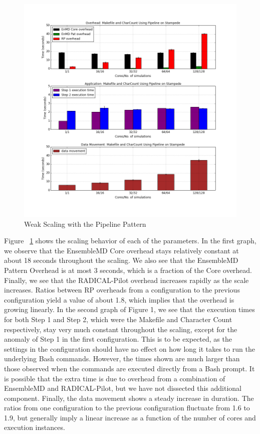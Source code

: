 \documentclass[]{article}
\begin{document}
		
		\begin{figure}[H]
			\centering
			\includegraphics[scale=.30]{img/pipeline_weak_scaling.png}
			\caption{Weak Scaling with the Pipeline Pattern}
			\label{fig:pipeline_weak_scaling}
		\end{figure}

		Figure ~\ref{fig:pipeline_weak_scaling} shows the scaling behavior of each of the parameters. In the first graph, we observe that the EnsembleMD Core overhead stays relatively constant at about 18 seconds throughout the scaling. We also see that the EnsembleMD Pattern Overhead is at most 3 seconds, which is a fraction of the Core overhead. Finally, we see that the RADICAL-Pilot overhead increases rapidly as the scale increases. Ratios between RP overheads from a configuration to the previous configuration yield a value of about 1.8, which implies that the overhead is growing linearly.
		In the second graph of Figure 1, we see that the execution times for both Step 1 and Step 2, which were the Makefile and Character Count respectively, stay very much constant throughout the scaling, except for the anomaly of Step 1 in the first configuration. This is to be expected, as the settings in the configuration should have no effect on how long it takes to run the underlying Bash commands. However, the times shown are much larger than those observed when the commands are executed directly from a Bash prompt. It is possible that the extra time is due to overhead from a combination of EnsembleMD and RADICAL-Pilot, but we have not dissected this additional component.
		Finally, the data movement shows a steady increase in duration. The ratios from one configuration to the previous configuration fluctuate from 1.6 to 1.9, but generally imply a linear increase as a function of the number of cores and execution instances. 
\end{document}
